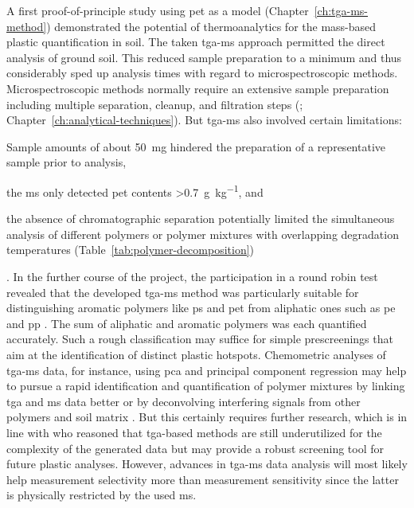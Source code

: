A first proof-of-principle study using \ac{pet} as a model (Chapter~\ref{ch:tga-ms-method}) demonstrated the potential of thermoanalytics for the mass-based plastic quantification in soil. The taken \ac{tga-ms} approach permitted the direct analysis of ground soil. This reduced sample preparation to a minimum and thus considerably sped up analysis times with regard to microspectroscopic methods. Microspectroscopic methods normally require an extensive sample preparation including multiple separation, cleanup, and filtration steps (\citealp[for instance,][]{LoderEnzymatic2017}; Chapter~\ref{ch:analytical-techniques}). But \ac{tga-ms} also involved certain limitations:
\begin{enumerate*}
	\item Sample amounts of about \SI{50}{\milli\gram} hindered the preparation of a representative sample prior to analysis,
	\item the \ac{ms} only detected \ac{pet} contents \SI{>0.7}{\gram\per\kilo\gram}, and
	\item the absence of chromatographic separation potentially limited the simultaneous analysis of different polymers or polymer mixtures with overlapping degradation temperatures (Table~\ref{tab:polymer-decomposition})
\end{enumerate*}.
In the further course of the project, the participation in a round robin test revealed that the developed \ac{tga-ms} method was particularly suitable for distinguishing aromatic polymers like \ac{ps} and \ac{pet} from aliphatic ones such as \ac{pe} and \ac{pp} \citep{BeckerQuantification2020}. The sum of aliphatic and aromatic polymers was each quantified accurately. Such a rough classification may suffice for simple prescreenings that aim at the identification of distinct plastic hotspots.
Chemometric analyses of \ac{tga-ms} data, for instance, using \ac{pca} and principal component regression may help to pursue a rapid identification and quantification of polymer mixtures by linking \ac{tga} and \ac{ms} data better or by deconvolving interfering signals from other polymers and soil matrix \citep{DavidIntroducing2019}. But this certainly requires further research, which is in line with \citet{MansaThermogravimetric2021} who reasoned that \ac{tga}-based methods are still underutilized for the complexity of the generated data but may provide a robust screening tool for future plastic analyses. However, advances in \ac{tga-ms} data analysis will most likely help measurement selectivity more than measurement sensitivity since the latter is physically restricted by the used \ac{ms}.

